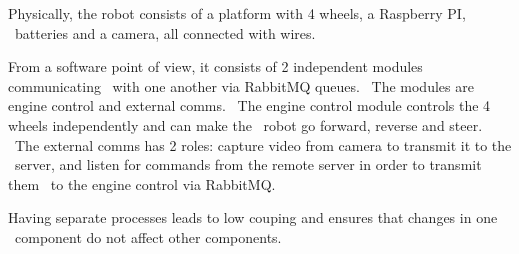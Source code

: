 Physically, the robot consists of a platform with 4 wheels, a Raspberry PI, \
batteries and a camera, all connected with wires.

From a software point of view, it consists of 2 independent modules communicating \
with one another via RabbitMQ queues. \
The modules are engine control and external comms. \
The engine control module controls the 4 wheels independently and can make the \
robot go forward, reverse and steer. \
The external comms has 2 roles: capture video from camera to transmit it to the \
server, and listen for commands from the remote server in order to transmit them \
to the engine control via RabbitMQ.

Having separate processes leads to low couping and ensures that changes in one \
component do not affect other components.

%
%
